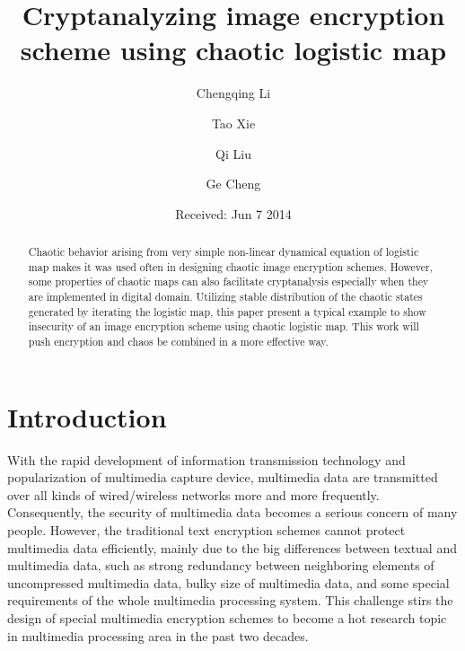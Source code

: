\documentclass[twocolumn]{svjour3}
\begin{document}
\title{Cryptanalyzing image encryption scheme using chaotic logistic map}

\author{Chengqing Li \and Tao Xie \and Qi Liu \and Ge Cheng}



\date{Received: Jun 7 2014}

\maketitle

\begin{abstract}
Chaotic behavior arising from very simple non-linear dynamical equation of logistic map makes
it was used often in designing chaotic image encryption schemes. However, some properties of chaotic maps
can also facilitate cryptanalysis especially when they are implemented in digital domain. Utilizing stable distribution of the chaotic states
generated by iterating the logistic map, this paper present a typical example to show insecurity
of an image encryption scheme using chaotic logistic map. This work will push encryption and chaos
be combined in a more effective way.


\end{abstract}

\section{Introduction}

With the rapid development of information transmission technology and popularization of
multimedia capture device, multimedia data are transmitted over all kinds of wired/wireless networks more
and more frequently. Consequently, the security of multimedia data
becomes a serious concern of many people. However, the traditional
text encryption schemes cannot protect multimedia data efficiently, mainly due to the
big differences between textual and multimedia data, such as strong redundancy between
neighboring elements of uncompressed multimedia data, bulky size of multimedia data, and some special
requirements of the whole multimedia processing system. This challenge stirs
the design of special multimedia encryption schemes to become a hot
research topic in multimedia processing area in the past
two decades.
\end{document}
